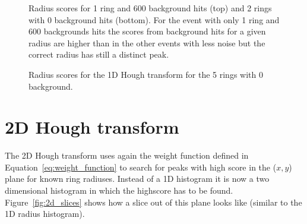 \documentclass[11pt]{scrreprt}
\begin{document}
\begin{figure}[htp]
        \centering

                \label{fig:2c0bg_radius1}%
                \label{fig:2c0b_radius2}
                \caption[1D Radius scores for two events]{Radius scores for 1 ring and 600 background hits (top) and 2 rings with 0 background hits (bottom). For the event
                with only 1 ring and 600 backgrounds hits the scores from background hits for a given radius are higher than in the other
                events with less noise but the correct radius has still a distinct peak.}
                \label{fig:1_2_c_radius}
\end{figure}
\begin{figure}[htb]
\centering
  

        \caption{Radius scores for the 1D Hough transform for the 5 rings with 0 background.}\label{fig:1d_ht_radius}
\end{figure}




\clearpage
\section{2D Hough transform} %
\label{sec:2d_hough_transform_results}
The 2D Hough transform uses again the weight function defined in Equation~\ref{eq:weight_function} to search for peaks with high
score in the ($x,y$) plane for known ring radiuses. Instead of a 1D histogram it is now a two dimensional histogram in which the highscore has to be found. Figure~\ref{fig:2d_slices} shows how a slice out of this plane looks like 
(similar to the 1D radius histogram).
\end{document}
